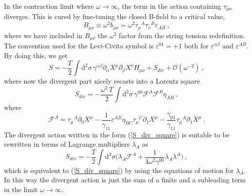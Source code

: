 \documentclass[12pt]{article}
\def\dd{\text{d}}
\numberwithin{equation}{section}
\begin{document}
In the contraction limit where $\omega \rightarrow \infty$, the term in the action containing $\tau_{\mu\nu}$ diverges. This is cured by fine-tuning the closed B-field to a critical value, 
\begin{equation}
B_{\mu\nu} \equiv \omega^2 b_{\mu\nu} = \omega^2 \tau_{\mu}{}^A \tau_{\nu}{}^B \varepsilon_{AB} \ , 
\end{equation}
where we have included in $B_{\mu\nu}$ the $\omega^2$ factor from the string tension redefinition. 
The convention used for the Levi-Civita symbol is $\varepsilon^{01} = + 1$ both for $\varepsilon^{\alpha\beta}$ and $\varepsilon^{AB}$.  By doing this, we get 
\begin{equation}
S  = - \frac{T}{2} \int \dd^2 \sigma \, \gamma^{\alpha\beta}\partial_{\alpha} X^{\mu} \partial_{\beta} X^{\nu} H_{\mu\nu} +  S_{div} + \mathcal{O}(\omega^{-2}) \ , 
\end{equation}
where now the divergent part nicely recasts into a Lorentz square 
\begin{equation}
\label{S_div_square}
S_{div} = - \frac{\omega^2 \, T}{2} \int \dd^2 \sigma \, \gamma^{00} \mathcal{F}^A \mathcal{F}^B \eta_{AB} \ , 
\end{equation}
where
\begin{equation}
 \mathcal{F}^A = \tau_{\mu}{}^A \partial_0 X^{\mu} - \frac{1}{\gamma_{11}} \varepsilon^{AB} \eta_{BC} \tau_{\mu}{}^C \partial_1 X^{\mu} - \frac{\gamma_{01}}{\gamma_{11}} \tau_{\mu}{}^A \partial_1 X^{\mu} \ . 
\end{equation}
The divergent action written in the form (\ref{S_div_square}) is suitable to be rewritten in terms of Lagrange multipliers $\lambda_{A}$ as 
\begin{equation}
S_{div} = - \frac{T}{2} \int \dd^2 \sigma \bigg( \lambda_A \mathcal{F}^A + \frac{1}{4 \omega^2 \gamma^{00}} \lambda_A \lambda^A \bigg) \ ,
\end{equation}
which is equivalent to (\ref{S_div_square}) by using the equations of motion for $\lambda_A$.  In this way the divergent action is just the sum of a finite and a subleading term in the limit $\omega\rightarrow \infty$. 
\end{document}
